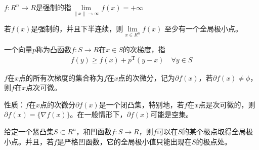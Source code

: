         \begin{definition}[强制]
        $f:R^n\to R$是强制的指$\mathop{\lim}\limits_{\|x\|\to \infty}f(x)=+\infty$
        \end{definition}
        \begin{theorem}
        若$f(x)$是强制的，并且下半连续，则$\mathop{\lim}\limits_{x\in R^n}f(x)$
        至少有一个全局极小点。
        \end{theorem}
        \begin{definition}[次梯度]
        一个向量$p$称为凸函数$f:S\to R$在$x\in S$的次梯度，指
        \begin{align*}
        f(y)\geqslant f(x)+p^\mathrm{T} (y-x)\quad \forall y\in S
        \end{align*}
        \end{definition}
        \begin{definition}[次微分]
        $f$在$x$点的所有次梯度的集合称为$f$在$x$点的次微分，记为$\partial f(x)$，若$\partial f(x)\neq \phi$，则$f$在$x$点次可微。
        \end{definition}
        \par
        性质：$f$在$x$点的次微分$\partial f(x)$是一个闭凸集，特别地，若$f$在$x$点是次可微的，则$\partial f(x)=\{\nabla f(x)\}$。在一般情形下，$\partial f(x)$可能是空集。
        \par
        给定一个紧凸集$S\subset R^n$，和凹函数$f:S\to R$，则$f$可以在$S$的某个极点取得全局极小点。并且，若$f$是严格凹函数，它的全局极小值只能出现在$S$的极点处。
